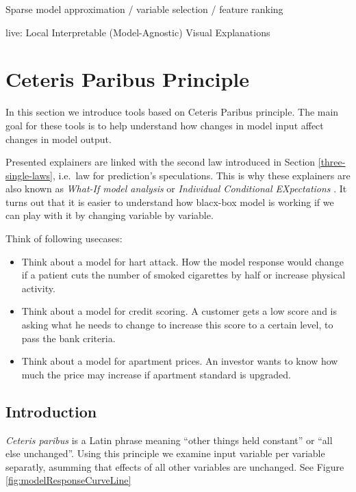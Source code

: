 \documentclass[]{book}
\providecommand{\tightlist}{%
  \setlength{\itemsep}{0pt}\setlength{\parskip}{0pt}}
\theoremstyle{definition}
\theoremstyle{definition}
\theoremstyle{definition}
\theoremstyle{remark}
\begin{document}
Sparse model approximation / variable selection / feature ranking

live: Local Interpretable (Model-Agnostic) Visual Explanations

\hypertarget{ceterisParibus}{%
\chapter{Ceteris Paribus Principle}\label{ceterisParibus}}

In this section we introduce tools based on Ceteris Paribus principle.
The main goal for these tools is to help understand how changes in model
input affect changes in model output.

Presented explainers are linked with the second law introduced in
Section \ref{three-single-laws}, i.e.~law for prediction's speculations.
This is why these explainers are also known as \emph{What-If model
analysis} or \emph{Individual Conditional EXpectations} \citep{ICEbox}.
It turns out that it is easier to understand how blacx-box model is
working if we can play with it by changing variable by variable.

Think of following usecases:

\begin{itemize}
\tightlist
\item
  Think about a model for hart attack. How the model response would
  change if a patient cuts the number of smoked cigarettes by half or
  increase physical activity.
\item
  Think about a model for credit scoring. A customer gets a low score
  and is asking what he needs to change to increase this score to a
  certain level, to pass the bank criteria.
\item
  Think about a model for apartment prices. An investor wants to know
  how much the price may increase if apartment standard is upgraded.
\end{itemize}

\hypertarget{introduction-2}{%
\section{Introduction}\label{introduction-2}}

\emph{Ceteris paribus} is a Latin phrase meaning ``other things held
constant'' or ``all else unchanged''. Using this principle we examine
input variable per variable separatly, asumming that effects of all
other variables are unchanged. See Figure
\ref{fig:modelResponseCurveLine}
\end{document}
